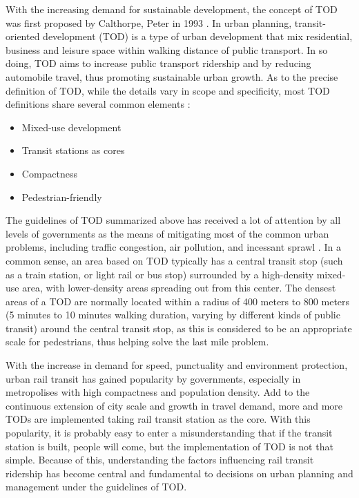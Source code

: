 With the increasing demand for sustainable development, the concept of TOD was first proposed by Calthorpe, Peter in 1993 \cite{calthorpe1993next}. In urban planning, transit-oriented development (TOD) is a type of urban development that mix residential, business and leisure space within walking distance of public transport. In so doing, TOD aims to increase public transport ridership and by reducing automobile travel, thus promoting sustainable urban growth. As to the precise definition of TOD, while the details vary in scope and specificity, most TOD definitions share several common elements \cite{boarnet1997story,bernick1997transit,megally2001california,cervero2004transit}:

\begin{itemize}
	\item Mixed-use development
	\item Transit stations as cores
	\item Compactness
	\item Pedestrian-friendly
\end{itemize}

The guidelines of TOD summarized above has received a lot of attention by all levels of governments as the means of mitigating most of the common urban problems, including traffic congestion, air pollution, and incessant sprawl \cite{cervero2002transit}. In a common sense, an area based on TOD typically has a central transit stop (such as a train station, or light rail or bus stop) surrounded by a high-density mixed-use area, with lower-density areas spreading out from this center. The densest areas of a TOD are normally located within a radius of 400 meters to 800 meters (5 minutes to 10 minutes walking duration, varying by different kinds of public transit) around the central transit stop, as this is considered to be an appropriate scale for pedestrians, thus helping solve the last mile problem. 

With the increase in demand for speed, punctuality and environment protection, urban rail transit has gained popularity by governments, especially in metropolises with high compactness and population density. Add to the continuous extension of city scale and growth in travel demand, more and more TODs are implemented taking rail transit station as the core. With this popularity, it is probably easy to enter a misunderstanding that if the transit station is built, people will come, but the implementation of TOD is not that simple. Because of this, understanding the factors influencing rail transit ridership has become central and fundamental to decisions on urban planning and management under the guidelines of TOD. 

